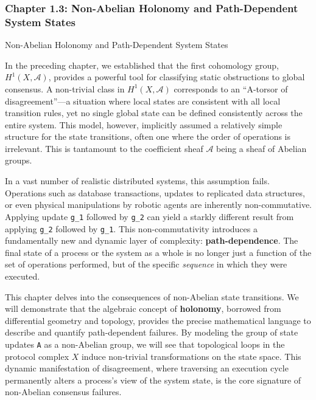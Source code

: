 \documentclass[
]{article}
\begin{document}
\subsubsection{Chapter 1.3: Non-Abelian Holonomy and Path-Dependent
System
States}\label{chapter-1.3-non-abelian-holonomy-and-path-dependent-system-states}

\protect{}\label{chapter-1-3-Non-Abelian_Holonomy_and_Path-Dependent}{}

Non-Abelian Holonomy and Path-Dependent System States

In the preceding chapter, we established that the first cohomology
group, \(H^1(X, \mathcal{A})\), provides a powerful tool for classifying
static obstructions to global consensus. A non-trivial class in
\(H^1(X, \mathcal{A})\) corresponds to an ``A-torsor of
disagreement''---a situation where local states are consistent with all
local transition rules, yet no single global state can be defined
consistently across the entire system. This model, however, implicitly
assumed a relatively simple structure for the state transitions, often
one where the order of operations is irrelevant. This is tantamount to
the coefficient sheaf \(\mathcal{A}\) being a sheaf of Abelian groups.

In a vast number of realistic distributed systems, this assumption
fails. Operations such as database transactions, updates to replicated
data structures, or even physical manipulations by robotic agents are
inherently non-commutative. Applying update \texttt{g\_1} followed by
\texttt{g\_2} can yield a starkly different result from applying
\texttt{g\_2} followed by \texttt{g\_1}. This non-commutativity
introduces a fundamentally new and dynamic layer of complexity:
\textbf{path-dependence}. The final state of a process or the system as
a whole is no longer just a function of the set of operations performed,
but of the specific \emph{sequence} in which they were executed.

This chapter delves into the consequences of non-Abelian state
transitions. We will demonstrate that the algebraic concept of
\textbf{holonomy}, borrowed from differential geometry and topology,
provides the precise mathematical language to describe and quantify
path-dependent failures. By modeling the group of state updates
\texttt{A} as a non-Abelian group, we will see that topological loops in
the protocol complex \(X\) induce non-trivial transformations on the
state space. This dynamic manifestation of disagreement, where
traversing an execution cycle permanently alters a process's view of the
system state, is the core signature of non-Abelian consensus failures.
\end{document}
